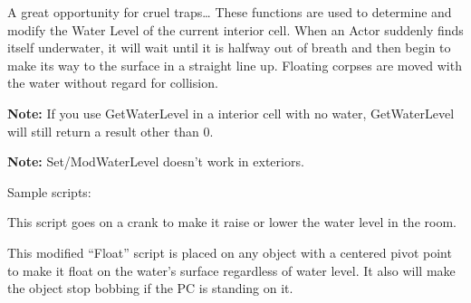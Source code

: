 A great opportunity for cruel traps\ldots{} These functions are used to
determine and modify the Water Level of the current interior cell. When
an Actor suddenly finds itself underwater, it will wait until it is
halfway out of breath and then begin to make its way to the surface in a
straight line up. Floating corpses are moved with the water without
regard for collision.

\textbf{Note:} If you use GetWaterLevel in a interior cell with no
water, GetWaterLevel will still return a result other than 0.

\textbf{Note:} Set/ModWaterLevel doesn't work in exteriors.

Sample scripts:

This script goes on a crank to make it raise or lower the water level in
the room.



This modified ``Float'' script is placed on any object with a centered
pivot point to make it float on the water's surface regardless of water
level. It also will make the object stop bobbing if the PC is standing
on it.

